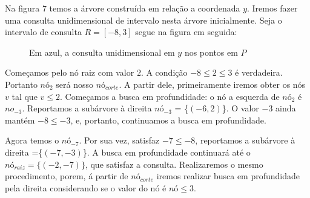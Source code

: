Na figura 7 temos a árvore construída em relação a coordenada $y$.
Iremos fazer uma consulta unidimensional de intervalo nesta árvore inicialmente.
Seja o intervalo de consulta $R = [-8, 3]$ segue na figura em seguida:

\begin{figure}[h]
\centering
    \caption {Em azul, a consulta unidimensional em $y$ nos pontos em $P$}
\end{figure}


Começamos pelo nó raiz com valor $2$. A condição $-8 \leq 2 \leq 3$ é verdadeira. Portanto $nó_{2}$
será nosso $nó_{corte}$.
A partir dele, primeiramente iremos obter os nós $v$ tal que $v \leq 2$. Começamos a busca em profundidade:
o nó a esquerda de $nó_{2}$ é $no_{-3}$. Reportamos a subárvore à direita $nó_{-3}$ = \{$(-6,2)$\}.
O valor $-3$ ainda mantém $-8 \leq -3$, e, portanto, continuamos a busca em profundidade.

Agora temos o $nó_{-7}$. Por sua vez, satisfaz  $-7 \leq -8$, reportamos a subárvore à direita =\{$(-7, -3)$\}.
A busca em profundidade continuará até o $nó_{raiz}=\{(-2,-7)\}$, que satisfaz a consulta.
Realizaremos o mesmo procedimento, porem, á partir de $nó_{corte}$ iremos realizar busca em profundidade pela direita considerando se o valor do nó é $nó \leq 3$.

